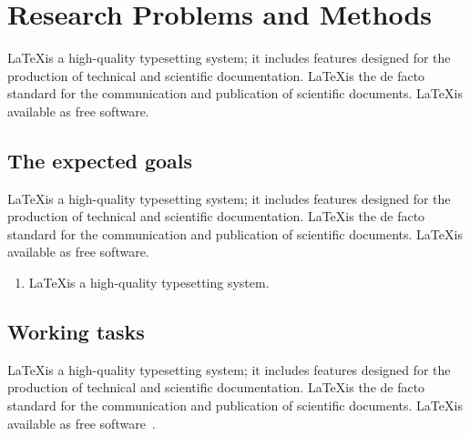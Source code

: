 \documentclass[12pt,a4paper]{article}
\begin{document}
\newpage
\section{Research Problems and Methods}
\label{sec:researchmethods}

\LaTeX is a high-quality typesetting system; it includes features designed for the production of technical and scientific documentation. \LaTeX is the de facto standard for the communication and publication of scientific documents. \LaTeX is available as free software.






\subsection{The expected goals}
\LaTeX is a high-quality typesetting system; it includes features designed for the production of technical and scientific documentation. \LaTeX is the de facto standard for the communication and publication of scientific documents. \LaTeX is available as free software.
\begin{enumerate}[1)]
\item \LaTeX is a high-quality typesetting system.
\end{enumerate}


\subsection{Working tasks}
\LaTeX is a high-quality typesetting system; it includes features designed for the production of technical and scientific documentation. \LaTeX is the de facto standard for the communication and publication of scientific documents. \LaTeX is available as free software~\cite{ICDMW2021}.


\newpage
\label{LastPage}
\begingroup \small
\makeatletter
\renewcommand\@openbib@code{\itemsep\z@}
\makeatother


\endgroup
\end{document}
